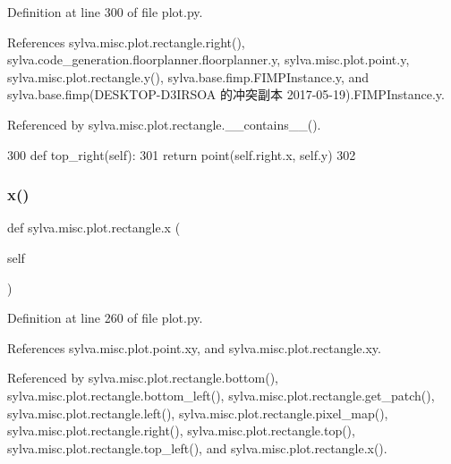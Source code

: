 Definition at line 300 of file plot.\+py.



References sylva.\+misc.\+plot.\+rectangle.\+right(), sylva.\+code\+\_\+generation.\+floorplanner.\+floorplanner.\+y, sylva.\+misc.\+plot.\+point.\+y, sylva.\+misc.\+plot.\+rectangle.\+y(), sylva.\+base.\+fimp.\+F\+I\+M\+P\+Instance.\+y, and sylva.\+base.\+fimp(\+D\+E\+S\+K\+T\+O\+P-\/\+D3\+I\+R\+S\+O\+A 的冲突副本 2017-\/05-\/19).\+F\+I\+M\+P\+Instance.\+y.



Referenced by sylva.\+misc.\+plot.\+rectangle.\+\_\+\+\_\+contains\+\_\+\+\_\+().


\begin{DoxyCode}
300         \textcolor{keyword}{def }top\_right(self):
301             \textcolor{keywordflow}{return} point(self.right.x, self.y)
302 
\end{DoxyCode}
\mbox{\label{classsylva_1_1misc_1_1plot_1_1rectangle_a935b64e6f087b6ab153df8a45e6dd72d}} 
\subsubsection{\texorpdfstring{x()}{x()}\hspace{0.1cm}{\footnotesize\ttfamily [1/2]}}
{\footnotesize\ttfamily def sylva.\+misc.\+plot.\+rectangle.\+x (\begin{DoxyParamCaption}\item[{}]{self }\end{DoxyParamCaption})}



Definition at line 260 of file plot.\+py.



References sylva.\+misc.\+plot.\+point.\+xy, and sylva.\+misc.\+plot.\+rectangle.\+xy.



Referenced by sylva.\+misc.\+plot.\+rectangle.\+bottom(), sylva.\+misc.\+plot.\+rectangle.\+bottom\+\_\+left(), sylva.\+misc.\+plot.\+rectangle.\+get\+\_\+patch(), sylva.\+misc.\+plot.\+rectangle.\+left(), sylva.\+misc.\+plot.\+rectangle.\+pixel\+\_\+map(), sylva.\+misc.\+plot.\+rectangle.\+right(), sylva.\+misc.\+plot.\+rectangle.\+top(), sylva.\+misc.\+plot.\+rectangle.\+top\+\_\+left(), and sylva.\+misc.\+plot.\+rectangle.\+x().


